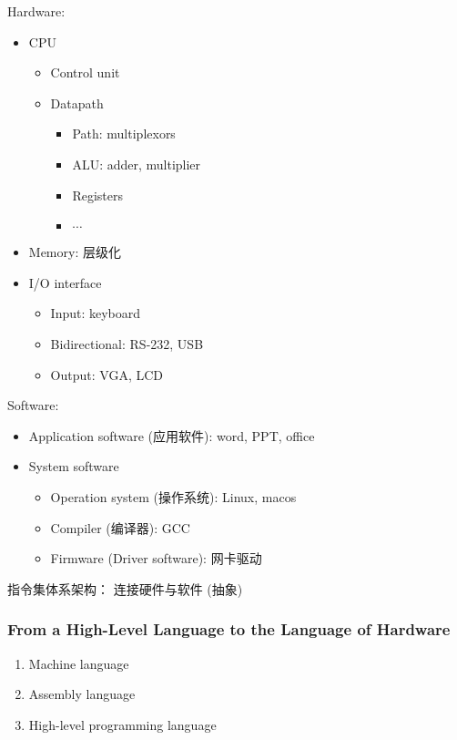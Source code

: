 Hardware: 
\begin{itemize}
    \item CPU
    \begin{itemize}
        \item Control unit
        \item Datapath
        \begin{itemize}
            \item Path: multiplexors
            \item ALU: adder, multiplier
            \item Registers
            \item $\cdots$
        \end{itemize}
    \end{itemize}
    \item Memory: 层级化
    \item I/O interface
    \begin{itemize}
        \item Input: keyboard
        \item Bidirectional: RS-232, USB
        \item Output: VGA, LCD
    \end{itemize}
\end{itemize}

Software: 
\begin{itemize}
    \item Application software (应用软件): word, PPT, office
    \item System software
    \begin{itemize}
        \item Operation system (操作系统): Linux, macos
        \item Compiler (编译器): GCC
        \item Firmware (Driver software): 网卡驱动 
    \end{itemize}
\end{itemize}

指令集体系架构： 连接硬件与软件 (抽象)

\subsubsection{From a High-Level Language to the Language of Hardware}

\begin{enumerate}
    \item Machine language
    \item Assembly language
    \item High-level programming language
\end{enumerate}

